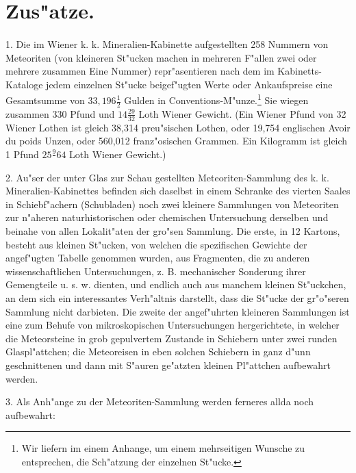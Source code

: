 \documentclass[a4paper, 11pt, oneside, polutonikogreek, german]{article}
\begin{document}
\section{Zus"atze.}
\paragraph{}
1. Die im Wiener k. k. Mineralien-Kabinette aufgestellten 258 Nummern von Meteoriten (von kleineren St"ucken machen in mehreren F"allen zwei oder mehrere zusammen Eine Nummer) repr"asentieren nach dem im Kabinetts-Kataloge jedem einzelnen St"ucke beigef"ugten Werte oder Ankaufspreise eine Gesamtsumme von $33,196\frac{1}{2}$ Gulden in Conventions-M"unze.\footnote{Wir liefern im einem Anhange, um einem mehrseitigen Wunsche zu entsprechen, die Sch"atzung der einzelnen St"ucke.} Sie wiegen zusammen 330 Pfund und $14\frac{29}{32}$ Loth Wiener Gewicht. (Ein Wiener Pfund von 32 Wiener Lothen ist gleich 38,314 preu"sischen Lothen, oder 19,754 englischen Avoir du poids Unzen, oder 560,012 franz"osischen Grammen. Ein Kilogramm ist gleich 1 Pfund $25\frac{9}{}64$ Loth Wiener Gewicht.)

2. Au"ser der unter Glas zur Schau gestellten Meteoriten-Sammlung des k. k. Mineralien-Kabinettes befinden sich daselbst in einem Schranke des vierten Saales in Schiebf"achern (Schubladen) noch zwei kleinere Sammlungen von Meteoriten zur n"aheren naturhistorischen oder chemischen Untersuchung derselben und beinahe von allen Lokalit"aten der gro"sen Sammlung. Die erste, in 12 Kartons, besteht aus kleinen St"ucken, von welchen die spezifischen Gewichte der angef"ugten Tabelle genommen wurden, aus Fragmenten, die zu anderen wissenschaftlichen Untersuchungen, z. B. mechanischer Sonderung ihrer Gemengteile u. s. w. dienten, und endlich auch aus manchem kleinen St"uckchen, an dem sich ein interessantes Verh"altnis darstellt, dass die St"ucke der gr"o"seren Sammlung nicht darbieten. Die zweite der angef"uhrten kleineren Sammlungen ist eine zum Behufe von mikroskopischen Untersuchungen hergerichtete, in welcher die Meteorsteine in grob gepulvertem Zustande in Schiebern unter zwei runden Glaspl"attchen; die Meteoreisen in eben solchen Schiebern in ganz d"unn geschnittenen und dann mit S"auren ge"atzten kleinen Pl"attchen aufbewahrt werden.

3. Als Anh"ange zu der Meteoriten-Sammlung werden ferneres allda noch aufbewahrt:
\end{document}
